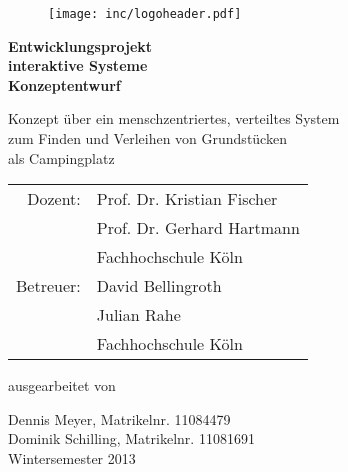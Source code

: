 
\begin{titlepage}

\begin{center}

\begin{figure}[!ht]
	\centering
		\texttt{[image: inc/logoheader.pdf]}
\end{figure}

\vspace{4.0cm}

\begin{Huge}
	\textbf{Entwicklungsprojekt }\\
	\vspace{0.1cm}
	\textbf{interaktive Systeme}\\
	\vspace{0.1cm}
	\textbf{Konzeptentwurf}\\

\end{Huge}

\vspace{0.8cm}

\begin{LARGE}
	Konzept über ein menschzentriertes, verteiltes System\\
	\vspace{0.1cm}
	zum Finden und Verleihen von Grundstücken\\
	\vspace{0.1cm}
	als Campingplatz\\
\end{LARGE}

\vspace{2cm}

\begin{tabular}{rl}
        Dozent:  &  Prof. Dr. Kristian Fischer\\
       		 	 &  Prof. Dr. Gerhard Hartmann\\
       			 &  \small Fachhochschule Köln \\[1.0em]
      Betreuer:  &  David Bellingroth\\
				 &  Julian Rahe\\
       			 &  \small Fachhochschule Köln\\
\end{tabular}

\vspace{1.6cm}

\begin{large}
	ausgearbeitet von\\
	\vspace{0.2cm}
\end{large}

\begin{Large}
	Dennis Meyer, Matrikelnr. 11084479\\
	Dominik Schilling, Matrikelnr. 11081691\\
	\vspace{1cm}
	Wintersemester 2013
\end{Large}

\end{center}

\end{titlepage}
